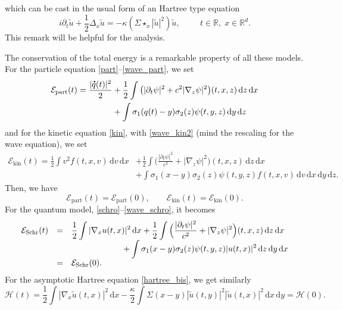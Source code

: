 \documentclass[10pt]{amsart}
\let\tilde\oldtilde
\theoremstyle{definition}
\newcommand*{\overbigdot}[1]{%
\accentset{\mbox{\large\bfseries .}}{#1}}
\let\tilde\widetilde
\newcommand{\R}{\mathbb{R}}
\let\ds\displaystyle
\newcommand{\ud}{\, {\mathrm{d}}}
\begin{document}
which can be cast in the usual form of an Hartree type equation
\begin{equation}\label{hartree_bis}
i\partial_{t}\tilde u+\frac{1}{2}\Delta_{x}\tilde u=-\kappa\left(\Sigma\star_{x}|\tilde u|^{2}\right)\tilde u,\hspace{1cm}t\in\R,\;x\in\R^{d}.
\end{equation}
This remark will be helpful for the analysis.

The conservation of the total
energy
is a remarkable property of all these models.
For the particle equation \eqref{part}--\eqref{wave_part}, we set
\begin{align*}
\mathcal E_{\mathrm{part}}(t)=\ds\frac{|\overbigdot q(t)|^2}{2} &+\frac12\ds\int \big(
|\partial_t \psi | ^ 2+ c^2 |\nabla_z \psi|^2\big) (t,x,z) \ud z\ud x
\\
&+\int \sigma_1( q(t)-y)\sigma_2(z)\psi(t,y,z)\ud y \ud z
\end{align*}
and for the kinetic equation \eqref{kin}, with \eqref{wave_kin2}
(mind the rescaling for the wave equation), we set
\begin{align*}
\mathcal E_{\mathrm{kin}}(t)
=\frac{1}{2} \ds\int v^2 f(t,x,v)\ud v \ud x&+\frac{1}{2}\ds\int \Big(\frac{|\partial_t \psi | ^ 2}{c^2}+ |\nabla_z \psi|^2\Big) (t,x,z) \ud z\ud x
\\
&+\int \sigma_1( x-y)\sigma_2(z)\psi(t,y,z)f(t,x,v) \ud v \ud x \ud y \ud z.
\end{align*}
Then, we have
\[
\mathcal E_{\mathrm{part}}(t)=\mathcal E_{\mathrm{part}}(0),\qquad
\mathcal E_{\mathrm{kin}}(t)=\mathcal E_{\mathrm{kin}}(0).
\]
For the quantum model, \eqref{schro}--\eqref{wave_schro}, it becomes
\begin{equation}\label{energy_Sch}
\begin{array}{lll}
\mathcal E_{\mathrm {Schr}}(t)&=&
\ds\frac{1}{2}
\ds\int |\nabla_{x}u(t,x)|^2 \ud x+
\ds\frac{1}{2}\ds\int \Big(
\ds\frac{|\partial_t \psi | ^ 2}{c^2}+ |\nabla_z \psi|^2\Big) (t,x,z) \ud z\ud x
\\&&\hspace*{2.2cm} +
\ds \int
\sigma_{1} (x-y) \sigma_{2}(z)\psi(t,y,z) |u(t,x) |^{2}\ud z\ud y\ud x
\\&=&\mathcal E_{\mathrm {Schr}}(0).
\end{array}
\end{equation}
For
the asymptotic Hartree equation \eqref{hartree_bis}, we get
similarly
\begin{equation}\label{energy_Har}
\mathcal H(t)=\frac{1}{2}\ds\int |\nabla_{x}\tilde u(t,x)|^2 \ud x
-\frac{\kappa}{2}\ds\int \Sigma(x-y) |\tilde u(t,y) |^{2}|\tilde u(t,x) |^{2}\ud x\ud y
=\mathcal H(0).
\end{equation}
\end{document}
